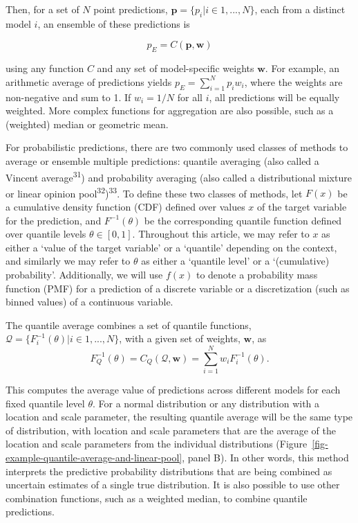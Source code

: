 \documentclass[
]{article}
\begin{document}
Then, for a set of \(N\) point predictions,
\(\pmb{p} = \{p_i|i \in 1, ..., N\}\), each from a distinct model \(i\),
an ensemble of these predictions is

\[
p_E = C(\pmb{p}, \pmb{w}) 
\]

using any function \(C\) and any set of model-specific weights
\(\pmb{w}\). For example, an arithmetic average of predictions yields
\(p_E = \sum_{i=1}^Np_iw_i\), where the weights are non-negative and sum
to 1. If \(w_i = 1/N\) for all \(i\), all predictions will be equally
weighted. More complex functions for aggregation are also possible, such
as a (weighted) median or geometric mean.

For probabilistic predictions, there are two commonly used classes of
methods to average or ensemble multiple predictions: quantile averaging
(also called a Vincent average\textsuperscript{31}) and probability
averaging (also called a distributional mixture or linear opinion
pool\textsuperscript{32})\textsuperscript{33}. To define these two
classes of methods, let \(F(x)\) be a cumulative density function (CDF)
defined over values \(x\) of the target variable for the prediction, and
\(F^{-1}(\theta)\) be the corresponding quantile function defined over
quantile levels \(\theta \in [0, 1]\). Throughout this article, we may
refer to \(x\) as either a `value of the target variable' or a
`quantile' depending on the context, and similarly we may refer to
\(\theta\) as either a `quantile level' or a `(cumulative) probability'.
Additionally, we will use \(f(x)\) to denote a probability mass function
(PMF) for a prediction of a discrete variable or a discretization (such
as binned values) of a continuous variable.

The quantile average combines a set of quantile functions,
\(\mathcal{Q} = \{F_i^{-1}(\theta)| i \in 1,...,N \}\), with a given set
of weights, \(\pmb{w}\), as \[
F^{-1}_Q(\theta) = C_Q(\mathcal{Q}, \pmb{w}) = \sum_{i = 1}^Nw_iF^{-1}_i(\theta).
\]

This computes the average value of predictions across different models
for each fixed quantile level \(\theta\). For a normal distribution or
any distribution with a location and scale parameter, the resulting
quantile average will be the same type of distribution, with location
and scale parameters that are the average of the location and scale
parameters from the individual distributions
(Figure~\ref{fig-example-quantile-average-and-linear-pool}, panel B). In
other words, this method interprets the predictive probability
distributions that are being combined as uncertain estimates of a single
true distribution. It is also possible to use other combination
functions, such as a weighted median, to combine quantile predictions.
\end{document}
